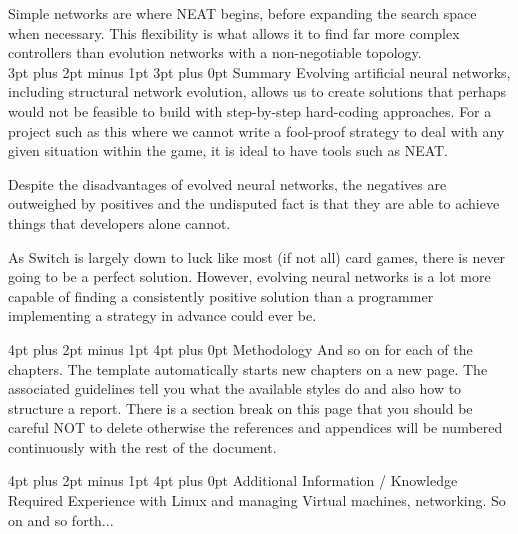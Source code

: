 \documentclass[12pt,a4paper]{article}
\makeatletter
\renewcommand\subsection{\@startsection {subsection}{1}{2mm} %
                               {3pt plus 2pt minus 1pt} %
                               {3pt plus 0pt} %
                               {\normalfont\bfseries}}
\renewcommand\section{\@startsection {section}{1}{0mm} %
                               {4pt plus 2pt minus 1pt} %
                               {4pt plus 0pt} %
                               {\bfseries}}
\makeatother
\begin{document}
 Simple networks are where NEAT begins, before expanding the search space when necessary\citep{EvolvingARovingEyeForGo}. This flexibility is what allows it to find far more complex controllers than evolution networks with a non-negotiable topology.\\


\subsection{Summary}
Evolving artificial neural networks, including structural network evolution, allows us to create solutions that perhaps would not be feasible to build with step-by-step hard-coding approaches. For a project such as this where we cannot write a fool-proof strategy to deal with any given situation within the game, it is ideal to have tools such as NEAT. 

Despite the disadvantages of evolved neural networks, the negatives are outweighed by positives and the undisputed fact is that they are able to achieve things that developers alone cannot. 

As Switch is largely down to luck like most (if not all) card games, there is never going to be a perfect solution. However, evolving neural networks is a lot more capable of finding a consistently positive solution than a programmer implementing a strategy in advance could ever be. 

\newpage
\section{Methodology}
And so on for each of the chapters.  The template automatically starts new chapters on a new page.  The associated guidelines tell you what the available styles do and also how to structure a report.
There is a section break on this page that you should be careful NOT to delete otherwise the references and appendices will be numbered continuously with the rest of the document.

\newpage
\section{Additional Information / Knowledge Required}
Experience with Linux and managing Virtual machines, networking.
So on and so forth...
\end{document}
